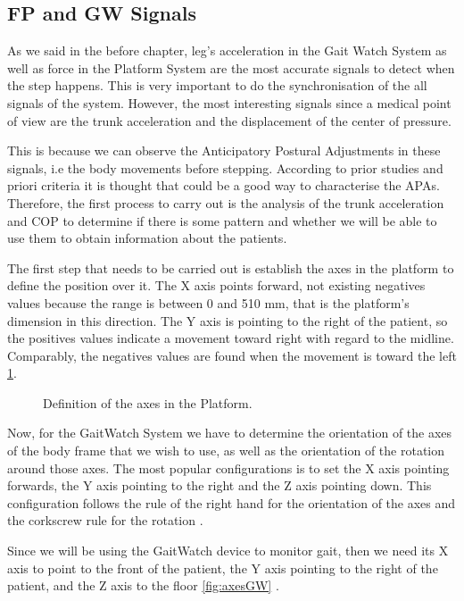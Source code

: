 \subsection{FP and GW Signals}
As we said in the before chapter, leg's acceleration in the Gait Watch System as well as force in the Platform System are the most accurate signals to detect when the step happens. This is very important to do the synchronisation of the all signals of the system. However, the most interesting signals since a medical point of view are the trunk acceleration and the displacement of the center of pressure.

This is because we can observe the Anticipatory Postural Adjustments in these signals, i.e the body movements before stepping. According to prior studies and priori criteria it is thought that could be a good way to characterise the APAs.
Therefore, the first process to carry out is the analysis of the trunk acceleration and COP to determine if there is some pattern and whether we will be able to use them to obtain information about the patients.

The first step that needs to be carried out is establish the axes in the platform to define the position over it. The X axis points forward, not existing negatives values because the range is between 0 and 510 mm, that is the platform’s dimension in this direction. The Y axis is pointing to the right of the patient, so the positives values indicate a movement toward right with regard to the midline. Comparably, the negatives values are found when the movement is toward the left \ref{fig:axesFP}.
\begin{figure}[H]
	\centering
	\caption{Definition of the axes in the Platform.}
	\label{fig:axesFP}
\end{figure}
Now, for the GaitWatch System we have to determine the orientation of the axes of the body frame that we wish to use, as well as the orientation of the rotation around those axes. The most popular configurations is to set the X axis pointing forwards, the Y axis pointing to the right and the Z axis pointing down. This configuration follows the rule of the right hand for the orientation of the axes and the corkscrew rule for the rotation \cite{OlivaresBotzel2013}. 

Since we will be using the GaitWatch device to monitor gait, then we need its X axis to point to the front of the patient, the Y axis pointing to the right  of the patient, and the Z axis to the floor \ref{fig:axesGW} \cite{OlivaresBotzel2013}.

